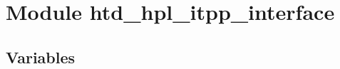 %
%
%


\section{Module htd\_hpl\_itpp\_interface}

    \label{htd_hpl_itpp_interface}


  \subsection{Variables}

